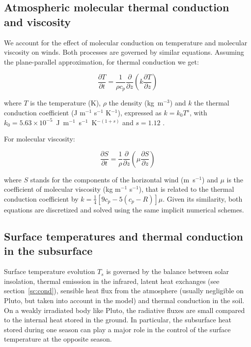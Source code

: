 \subsection{Atmospheric molecular thermal conduction and viscosity}
\label{sc:acond}

We account for the effect of molecular conduction on temperature and molecular 
viscosity on winds.  Both processes are governed by similar equations.
Assuming the plane-parallel approximation, for  thermal conduction we get:

\begin{equation} 
\frac{\partial T}{\partial t}=\frac{1}{\rho 
c_p}\frac{\partial}{\partial z}\left(k\frac{\partial T}{\partial z}\right) 
\end{equation}

where $T$ is the temperature (K), $\rho$ the density (kg~m$^{-3}$) and $k$ the
thermal conduction coefficient (J m$^{-1}$ s$^{-1}$ K$^{-1}$), expressed as
$k = k_0 T^{s}$, with 
$k_0 = 5.63\times10^{-5}$~J~m$^{-1}$~s$^{-1}$~K$^{-(1+s)}$ 
and $s=1.12$ \citep{Hubb:90}. 

For molecular viscosity:

\begin{equation} \frac{\partial S}{\partial 
t}=\frac{1}{\rho}\frac{\partial}{\partial z}\left(\mu \frac{\partial S}{\partial 
z}\right) 
\end{equation}

where $S$ stands for the components of the horizontal wind
(m~s$^{-1}$) 
and $\mu$ is the coefficient of molecular viscosity (kg m$^{-1}$ s$^{-1}$), that
is related to the thermal conduction coefficient by $k=\frac{1}{4}[9c_p-5(c_p-R)]\mu$.
Given its similarity, both equations are discretized
and solved using the same implicit numerical schemes.


\subsection{Surface temperatures and thermal conduction in the subsurface}
\label{sc:csoil}

Surface temperature evolution $T_s$ is governed by the balance between solar
insolation, thermal emisssion in the infrared, 
latent heat exchanges (see section~\ref{sc:cond}), sensible heat flux from the
atmosphere (usually negligible on Pluto, but taken into account in the model) 
and thermal conduction in the soil.
On a weakly irradiated body like Pluto, the radiative fluxes are small compared to the
internal heat stored in the ground. In particular, the subsurface heat stored during one
season can play a major role in the control of the surface temperature
at the opposite season.

